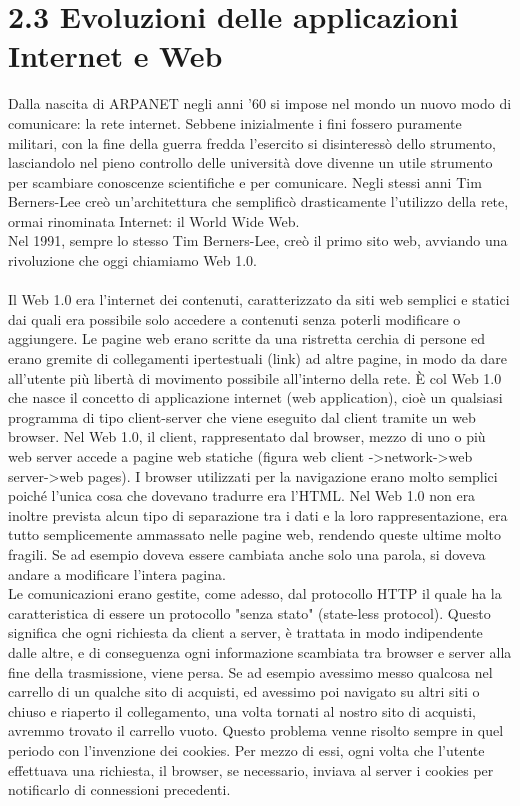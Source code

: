 \documentclass{report}%
\theoremstyle{plain}
\begin{document}
\section*{2.3 Evoluzioni delle applicazioni Internet e Web}
Dalla nascita di ARPANET negli anni '60 si impose nel mondo un nuovo modo di comunicare: la rete internet. Sebbene inizialmente i fini fossero puramente militari, con la fine della guerra fredda l'esercito si disinteressò dello strumento, lasciandolo nel pieno controllo delle università dove divenne un utile strumento per scambiare conoscenze scientifiche e per comunicare. Negli stessi anni Tim Berners-Lee creò un'architettura che semplificò drasticamente l'utilizzo della rete, ormai rinominata Internet: il World Wide Web.\\Nel 1991, sempre lo stesso Tim Berners-Lee, creò il primo sito web, avviando una rivoluzione che oggi chiamiamo Web 1.0.\\\\
Il Web 1.0 era l'internet dei contenuti, caratterizzato da siti web semplici e statici dai quali era possibile solo accedere a contenuti senza poterli modificare o aggiungere. Le pagine web erano scritte da una ristretta cerchia di persone ed erano gremite di collegamenti ipertestuali (link) ad altre pagine, in modo da dare all'utente più libertà di movimento possibile all'interno della rete. È col Web 1.0 che nasce il concetto di applicazione internet (web application), cioè un qualsiasi programma di tipo client-server che viene eseguito dal client tramite un web browser. Nel Web 1.0, il client, rappresentato dal browser, mezzo di uno o più web server accede a pagine web statiche (figura web client ->network->web server->web pages). I browser utilizzati per la navigazione erano molto semplici poiché l'unica cosa che dovevano tradurre era l'HTML. Nel Web 1.0 non era inoltre prevista alcun tipo di separazione tra i dati e la loro rappresentazione, era tutto semplicemente ammassato nelle pagine web, rendendo queste ultime molto fragili. Se ad esempio doveva essere cambiata anche solo una parola, si doveva andare a modificare l'intera pagina.  \\Le comunicazioni erano gestite, come adesso, dal protocollo HTTP il quale ha la caratteristica di essere un protocollo "senza stato" (state-less protocol). Questo significa che ogni richiesta da client a server, è trattata in modo indipendente dalle altre, e di conseguenza ogni informazione scambiata tra browser e server alla fine della trasmissione, viene persa. Se ad esempio avessimo messo qualcosa nel carrello di un qualche sito di acquisti, ed avessimo poi navigato su altri siti o chiuso e riaperto il collegamento, una volta tornati al nostro sito di acquisti, avremmo trovato il carrello vuoto. Questo problema venne risolto sempre in quel periodo con l'invenzione dei cookies. Per mezzo di essi, ogni volta che l'utente effettuava una richiesta, il browser, se necessario, inviava al server i cookies per notificarlo di connessioni precedenti.\\\\
\end{document}
